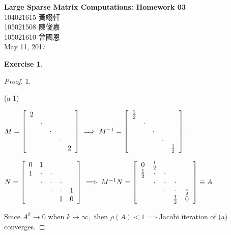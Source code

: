 \documentclass[11pt,a4paper]{article}
\renewcommand{\(}{\left(}
\renewcommand{\)}{\right)}
\renewcommand{\title}{Large Sparse Matrix Computations: Homework 03}
\renewcommand{\author}{104021615 黃翊軒\\105021508	陳俊嘉\\105021610 曾國恩}
\renewcommand{\maketitle}{\begin{center}\textbf{\Large\title}\\[6pt] {\author}\\[6pt] {\color{Gray}\footnotesize May 11, 2017}\end{center}}
\newtheorem{exercise}{Exercise}
\begin{document}
  \maketitle
  
  \setcounter{exercise}{0}
  
  \begin{exercise}
  \end{exercise}  
  \begin{proof}
  	1.
  	
  	(a-1)
  	
  	$M=\left[
  	\begin{array}
  	[c]{ccccc}%
  	2 &  &  &  & \\
  	& \cdot &  &  & \\
  	&  & \cdot &  & \\
  	&  &  & \cdot & \\
  	&  &  &  & 2
  	\end{array}
  	\right]  \implies M^{-1}=\left[
  	\begin{array}
  	[c]{ccccc}%
  	\frac{1}{2} &  &  &  & \\
  	& \cdot &  &  & \\
  	&  & \cdot &  & \\
  	&  &  & \cdot & \\
  	&  &  &  & \frac{1}{2}%
  	\end{array}
  	\right]  .$
  	
  	$N=\left[
  	\begin{array}
  	[c]{ccccc}%
  	0 & 1 &  &  & \\
  	1 & \cdot & \cdot &  & \\
  	& \cdot & \cdot & \cdot & \\
  	&  & \cdot & \cdot & 1\\
  	&  &  & 1 & 0
  	\end{array}
  	\right]  \implies M^{-1}N=\left[
  	\begin{array}
  	[c]{ccccc}%
  	0 & \frac{1}{2} &  &  & \\
  	\frac{1}{2} & \cdot & \cdot &  & \\
  	& \cdot & \cdot & \cdot & \\
  	&  & \cdot & \cdot & \frac{1}{2}\\
  	&  &  & \frac{1}{2} & 0
  	\end{array}
  	\right]  \equiv A$
  	
  	Since $A^{k}\longrightarrow0$ when $k\longrightarrow\infty,$ then
  	$\rho(A)<1\implies$Jacobi iteration of (a) converges.
  	

\end{proof}
\end{document}
